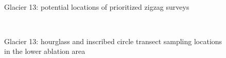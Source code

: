 \documentclass{sfuthesis}
\begin{document}
{\begin{appendices}
	\begin{figure}[H]
	\centering
	\\
\caption[]{Glacier 13: potential locations of prioritized zigzag surveys}
\end{figure}
	\begin{figure}[H]
	\centering
	\\
\caption[]{Glacier 13: hourglass and inscribed circle transect sampling locations in the lower ablation area}
\end{figure}
	\begin{figure}[H]
	\centering

\end{figure}
\end{appendices}}
\end{document}
